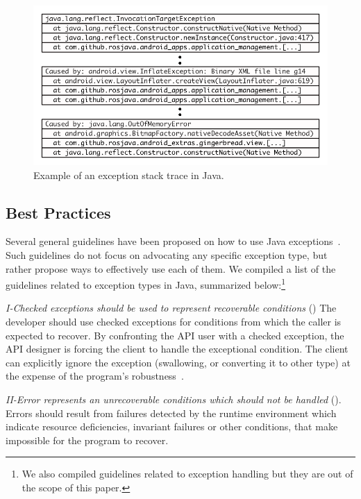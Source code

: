 \documentclass[conference]{IEEEtran}
\begin{document}
\begin{figure} \centering \includegraphics[scale=0.5]{stacktrace_bw.png}
\caption{Example of an exception stack trace in Java.}
\label{fig:wrapping}
\end{figure}

\subsection{Best Practices}
\label{sec:best}

Several general guidelines have been proposed on how to use Java
exceptions~\cite{mandrioli1992advances,gosling2000java,wirfs2006toward,
bloch2008effective}. Such guidelines do not focus on 
advocating any specific exception type, but rather propose ways to effectively use each of them.
 We compiled a list of the guidelines related to exception types in Java, 
summarized below:\footnote{We also compiled guidelines related
to exception handling but they are out of the scope of this paper.}


\emph{I-Checked exceptions should be used to represent recoverable
conditions} (\cite{mandrioli1992advances,gosling2000java,wirfs2006toward,bloch2008effective})
The developer should use checked exceptions for conditions from which the caller
is expected to recover. By confronting the API user with a checked exception,
the API designer is forcing the client to handle the exceptional condition. The
client can explicitly ignore the exception (swallowing, or converting it to
other type) at the expense of the program's robustness~\cite{gosling2000java}.

\emph{II-Error represents an unrecoverable conditions which should not be handled} 
(\cite{gosling2000java}).  Errors should result from failures detected
by the runtime environment which indicate resource deficiencies, invariant
failures or other conditions, that make impossible for the program to recover.
\end{document}
